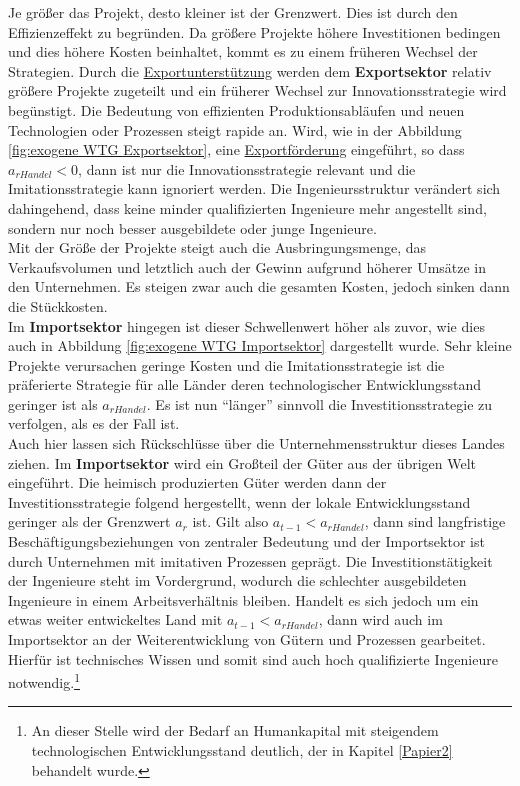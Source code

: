 Je grö{\ss}er das Projekt, desto kleiner ist der Grenzwert. Dies ist durch den Effizienzeffekt zu begründen. Da grö{\ss}ere Projekte höhere Investitionen bedingen und dies höhere Kosten beinhaltet, kommt es zu einem früheren Wechsel der Strategien. 
Durch die \uline{Exportunterstützung} werden dem \textbf{Exportsektor} relativ grö{\ss}ere Projekte zugeteilt und ein früherer Wechsel zur Innovationsstrategie wird begünstigt. Die Bedeutung von effizienten Produktionsabläufen und neuen Technologien oder Prozessen steigt rapide an. 
Wird, wie in der Abbildung \ref{fig:exogene WTG Exportsektor}, eine \uline{Exportförderung} eingeführt, so dass $a_{rHandel}<0$, dann ist  nur die \textcolor[rgb]{0.74,0.97,0.22}{Innovationsstrategie} relevant und die \textcolor[rgb]{0,0.32,0}{Imitationsstrategie} kann ignoriert werden. Die Ingenieursstruktur verändert sich dahingehend, dass keine minder qualifizierten Ingenieure mehr angestellt sind, sondern nur noch besser ausgebildete oder junge Ingenieure.\\ 
Mit der Grö{\ss}e der Projekte steigt auch die Ausbringungsmenge, das Verkaufsvolumen und letztlich auch der Gewinn aufgrund höherer Umsätze in den Unternehmen. Es steigen zwar auch die gesamten Kosten, jedoch sinken dann die Stückkosten. \\
Im \textbf{Importsektor} hingegen ist dieser Schwellenwert höher als zuvor, wie dies auch in Abbildung \ref{fig:exogene WTG Importsektor} dargestellt wurde. Sehr kleine Projekte verursachen geringe Kosten und die \textcolor[rgb]{0,0.32,0}{Imitationsstrategie} ist die präferierte Strategie für alle Länder deren technologischer Entwicklungsstand geringer ist als $a_{rHandel}$. Es ist nun "`länger"' sinnvoll die \textcolor[rgb]{0,0.32,0}{Investitionsstrategie} zu verfolgen, als es  der Fall ist.\\ %
Auch hier lassen sich Rückschlüsse über die Unternehmensstruktur dieses Landes ziehen.
Im \textbf{Importsektor} wird ein Gro{\ss}teil der Güter aus der übrigen Welt eingeführt. Die heimisch produzierten Güter werden dann der \textcolor[rgb]{0,0.32,0}{Investitionsstrategie} folgend hergestellt, wenn der lokale Entwicklungsstand geringer als der Grenzwert $a_r$ ist. Gilt also $a_{t-1}< a_{rHandel}$, dann sind langfristige Beschäftigungsbeziehungen von zentraler Bedeutung und der Importsektor ist durch Unternehmen mit imitativen Prozessen geprägt. Die Investitionstätigkeit der Ingenieure steht im Vordergrund, wodurch die schlechter ausgebildeten Ingenieure in einem Arbeitsverhältnis bleiben. Handelt es sich jedoch um ein etwas weiter entwickeltes Land mit $a_{t-1}<a_{rHandel}$, dann wird auch im Importsektor an der Weiterentwicklung von Gütern und Prozessen gearbeitet. Hierfür ist technisches Wissen und somit sind auch hoch qualifizierte Ingenieure notwendig.\footnote{An dieser Stelle wird der Bedarf an Humankapital mit steigendem technologischen Entwicklungsstand deutlich, der in Kapitel \ref{Papier2} behandelt wurde.}\\


